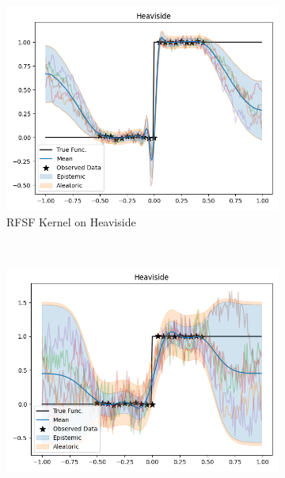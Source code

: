 	\begin{figure}
		\centering
		\begin{subfigure}{0.49\linewidth}
			\centering
			\includegraphics[width=\linewidth, height=0.618033988749895\linewidth]{graphics/generated/gp-heaviside-rfsf.png}  %
			\caption{\acs{RFSF} Kernel on Heaviside}
		\end{subfigure}
		~
		\begin{subfigure}{0.49\linewidth}
			\centering
			\includegraphics[width=\linewidth, height=0.618033988749895\linewidth]{graphics/generated/gp-heaviside-rbf.png}  %

\end{subfigure}
\end{figure}
